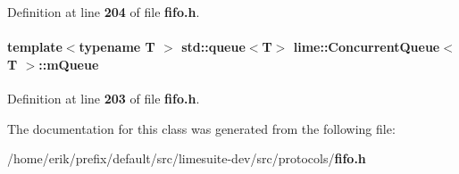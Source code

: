 Definition at line {\bf 204} of file {\bf fifo.\+h}.

\paragraph[{m\+Queue}]{\setlength{\rightskip}{0pt plus 5cm}template$<$typename T $>$ std\+::queue$<$T$>$ {\bf lime\+::\+Concurrent\+Queue}$<$ T $>$\+::m\+Queue\hspace{0.3cm}{\ttfamily [private]}}\label{classlime_1_1ConcurrentQueue_a57ebc78170c2fdf4658d46b5ed302e08}


Definition at line {\bf 203} of file {\bf fifo.\+h}.



The documentation for this class was generated from the following file\+:\begin{DoxyCompactItemize}
\item 
/home/erik/prefix/default/src/limesuite-\/dev/src/protocols/{\bf fifo.\+h}\end{DoxyCompactItemize}
